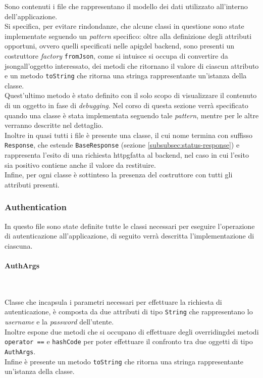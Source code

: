 Sono contenuti i file che rappresentano il modello dei dati utilizzato all'interno dell'applicazione.\\
Si specifica, per evitare rindondanze, che alcune classi in questione sono state implementate seguendo un \emph{pattern} specifico: oltre alla definizione degli attributi opportuni, ovvero quelli specificati nelle \gls{apig}\glsoccur del \gls{backend}\glsoccur, sono presenti un costruttore \emph{factory}\cite{site:factory} \lstinline{fromJson}, come si intuisce si occupa di convertire da \gls{jsong}\glsoccur all'oggetto interessato, dei metodi che ritornano il valore di ciascun attributo e un metodo \lstinline{toString} che ritorna una stringa rappresentante un'istanza della classe.\\
Quest'ultimo metodo è stato definito con il solo scopo di visualizzare il contenuto di un oggetto in fase di \emph{debugging}.
Nel corso di questa sezione verrà specificato quando una classe è stata implementata seguendo tale \emph{pattern}, mentre per le altre verranno descritte nel dettaglio. \\
Inoltre in quasi tutti i file è presente una classe, il cui nome termina con suffisso \lstinline{Response}, che estende \lstinline{BaseResponse} (sezione \ref{subsubsec:status-response}) e rappresenta l'esito di una richiesta \gls{httpg}\glsoccur fatta al \gls{backend}\glsoccur, nel caso in cui l'esito sia positivo contiene anche il valore da restituire.\\
Infine, per ogni classe è sottinteso la presenza del costruttore con tutti gli attributi presenti. 

\subsubsection*{Authentication}
\label{subsubsec:authentication}

In questo file sono state definite tutte le classi necessari per eseguire l'operazione di autenticazione all'applicazione, di seguito verrà descritta l'implementazione di ciascuna.

\paragraph*{AuthArgs} ~ \\
\label{par:auth-args}

\noindent Classe che incapsula i parametri necessari per effettuare la richiesta di autenticazione, è composta da due attributi di tipo \lstinline{String} che rappresentano lo \emph{username} e la \emph{password} dell'utente.\\
Inoltre espone due metodi che si occupano di effettuare degli \gls{overriding}\glsoccur dei metodi \lstinline{operator ==}\cite{site:operator-equals} e \lstinline{hashCode}\cite{site:hascode-property} per poter effettuare il confronto tra due oggetti di tipo \lstinline{AuthArgs}.\\
Infine è presente un metodo \lstinline{toString} che ritorna una stringa rappresentante un'istanza della classe.

